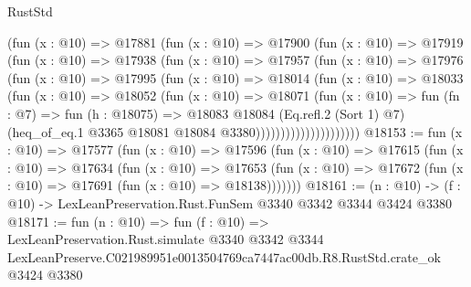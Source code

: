 \begin{lexlean}{RustStd}
\begin{coremodule}
                    (fun (x : @10) =>
                    @17881
                      (fun (x : @10) =>
                      @17900
                        (fun (x : @10) =>
                        @17919
                          (fun (x : @10) =>
                          @17938
                            (fun (x : @10) =>
                            @17957
                              (fun (x : @10) =>
                              @17976
                                (fun (x : @10) =>
                                @17995
                                  (fun (x : @10) =>
                                  @18014
                                    (fun (x : @10) =>
                                    @18033
                                      (fun (x : @10) =>
                                      @18052
                                        (fun (x : @10) =>
                                        @18071
                                          (fun (x : @10) =>
                                          fun (fn : @7) =>
                                          fun (h : @18075) =>
                                          @18083
                                            @18084
                                            (Eq.refl.{2} (Sort 1) @7)
                                            (heq_of_eq.{1}
                                              @3365
                                              @18081
                                              @18084
                                              @3380)))))))))))))))))))))
@18153 := fun (x : @10) =>
  @17577
    (fun (x : @10) =>
    @17596
      (fun (x : @10) =>
      @17615
        (fun (x : @10) =>
        @17634
          (fun (x : @10) =>
          @17653 (fun (x : @10) => @17672 (fun (x : @10) => @17691 (fun (x : @10) => @18138)))))))
@18161 := (n : @10) -> (f : @10) -> LexLeanPreservation.Rust.FunSem @3340 @3342 @3344 @3424 @3380
@18171 := fun (n : @10) =>
  fun (f : @10) =>
  LexLeanPreservation.Rust.simulate
    @3340
    @3342
    @3344
    LexLeanPreserve.C021989951e0013504769ca7447ac00db.R8.RustStd.crate_ok
    @3424
    @3380
\end{coremodule}
\end{lexlean}
